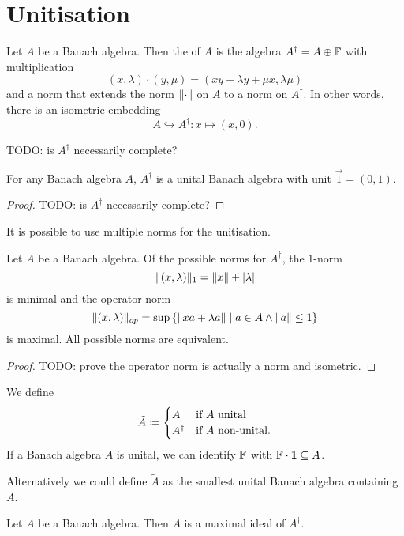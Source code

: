 \section{Unitisation}
\begin{definition}
Let $A$ be a Banach algebra. Then the  of $A$ is the algebra $A^\dagger = A\oplus \mathbb{F}$ with multiplication
\[ (x,\lambda)\cdot (y,\mu) = (xy+\lambda y + \mu x, \lambda\mu) \]
and a norm that extends the norm $\lVert\cdot\rVert$ on $A$ to a norm on $A^\dagger$. In other words, there is an isometric embedding
\[ A \hookrightarrow A^\dagger: x\mapsto (x,0). \]
\end{definition}
TODO: is $A^\dagger$ necessarily complete?
\begin{lemma}
For any Banach algebra $A$, $A^\dagger$ is a unital Banach algebra with unit $\vec{1} = (0,1)$.
\end{lemma}
\begin{proof}
TODO: is $A^\dagger$ necessarily complete?
\end{proof}
It is possible to use multiple norms for the unitisation.
\begin{proposition} \label{normsOfUnitisation}
Let $A$ be a Banach algebra. Of the possible norms for $A^\dagger$, the $1$-norm
\[ \lVert(x,\lambda)\rVert_1 = \lVert x\rVert+|\lambda| \]
is minimal and the operator norm
\[ \norm{(x,\lambda)}_{op} = \sup\setbuilder{\norm{xa + \lambda a}}{a\in A \land \norm{a}\leq 1} \]
is maximal. All possible norms are equivalent.
\end{proposition}
\begin{proof}
TODO: prove the operator norm is actually a norm and isometric.
\end{proof}

\begin{definition}
We define
\[ \tilde{A} \coloneqq \begin{cases}
A & \text{if $A$ unital} \\
A^\dagger & \text{if $A$ non-unital.}
\end{cases} \]
If a Banach algebra $A$ is unital, we can identify $\mathbb{F}$ with $\mathbb{F}\cdot \boldsymbol{\mathrm{1}} \subseteq A$.
\end{definition}

Alternatively we could define $\tilde{A}$ as the smallest unital Banach algebra containing $A$.

\begin{lemma} \label{algebraIdealInUnitisation}
Let $A$ be a Banach algebra. Then $A$ is a maximal ideal of $A^\dagger$.
\end{lemma}

